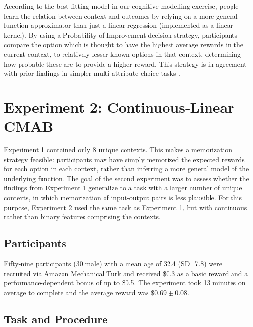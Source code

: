\documentclass[a4paper,natbib]{apa6}
\begin{document}
According to the best fitting model in our cognitive modelling exercise, people learn the relation between context and outcomes by relying on a more general function approximator than just a linear regression (implemented as a linear kernel). By using a Probability of Improvement decision strategy, participants compare the option which is thought to have the highest average rewards in the current context, to relatively lesser known options in that context, determining how probable these are to provide a higher reward. This strategy is in agreement with prior findings in simpler multi-attribute choice tasks \citep[for example,][]{carroll1991toward}. 




\section{Experiment 2: Continuous-Linear CMAB}

Experiment 1 contained only 8 unique contexts. This makes a memorization strategy feasible: participants may have simply memorized the expected rewards for each option in each context, rather than inferring a more general model of the underlying function. The goal of the second experiment was to assess whether the findings from Experiment 1 generalize to a task with a larger number of unique contexts, in which memorization of input-output pairs is less plausible. For this purpose, Experiment 2 used the same task as Experiment 1, but with continuous rather than binary features comprising the contexts. 

\subsection{Participants}

Fifty-nine participants (30 male) with a mean age of 32.4 (SD=7.8) were recruited via Amazon Mechanical Turk and received \$0.3 as a basic reward and a performance-dependent bonus of up to \$0.5. The experiment took 13 minutes on average to complete and the average reward was $\$0.69 \pm 0.08$.

\subsection{Task and Procedure}
\end{document}
